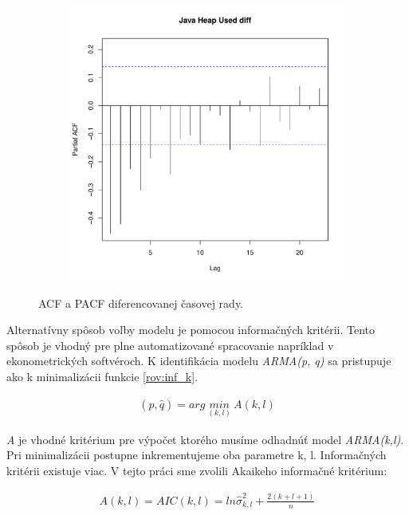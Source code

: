 \documentclass[12pt,a4paper,oneside,final]{article}
\theoremstyle{definition}
\theoremstyle{remark}
\numberwithin{equation}{section}
\begin{document}
\begin{figure}[H]
\begin{subfigure}[b]{0.45\textwidth}
        \includegraphics[width=1\linewidth]{images/heap_diff_pacf.pdf}
    \end{subfigure}
    \caption{ACF a PACF diferencovanej časovej rady.}
    \label{obr:heap_diff_acf_pacf}
\end{figure}

Alternatívny spôsob voľby modelu je pomocou informačných kritérii. Tento spôsob je
vhodný pre plne automatizované spracovanie \cite{cipra} napríklad v ekonometrických 
softvéroch. K identifikácia modelu \emph{ARMA(p, q)} sa pristupuje ako k minimalizácii funkcie
\ref{rov:inf_k}.

\begin{eqnarray} \label{rov:inf_k}
    (\hat{p}, \hat{q}) =arg\ \underset{(k,l)}{min}\ A(k, l)
\end{eqnarray}

\emph{A} je vhodné kritérium pre výpočet ktorého musíme odhadnúť model
\emph{ARMA(k,l)}. Pri minimalizácii postupne inkrementujeme oba parametre k, l.
Informačných kritérii existuje viac. V tejto práci sme zvolili Akaikeho informačné kritérium:

\begin{eqnarray} \label{rov:aic}
    A(k,l) = AIC(k,l) = ln\hat{\sigma}^{2}_{k,l} + \frac{2(k+l+1)}{n}
\end{eqnarray}
\end{document}
